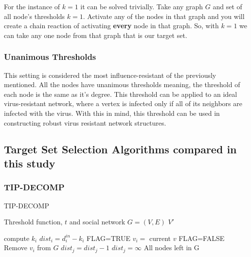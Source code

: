 For the instance of $k=1$ it can be solved trivially. Take any graph $G$ and set of all node's thresholds $k=1$. Activate any of the nodes in that graph and you will create a chain reaction of activating \textbf{every} node in that graph. So, with $k=1$ we can take any one node from that graph that is our target set.\cite{chen}
\subsubsection{Unanimous Thresholds}
This setting is considered the most influence-resistant of the previously mentioned.\cite{chen} All the nodes have unanimous thresholds meaning, the threshold of each node is the same as it's degree. This threshold can be applied to an ideal virus-resistant network, where a vertex is infected only if all of its neighbors are infected with the virus. With this in mind, this threshold can be used in constructing robust virus resistant network structures.\cite{chen}
\subsection{Target Set Selection Algorithms compared in this study}

\subsubsection{TIP-DECOMP}
\begin{algorithm}
	\caption{TIP-DECOMP}
	\begin{algorithmic}[1]
		\Require Threshold function, $t$ and social network $G=(V,E)$
		\Ensure $V'$
		
			\State compute $k_{i}$ 
		\EndFor
			\State $dist_{i}=d_{i}^{in}-k_{i} $
		\EndFor
		\State FLAG=TRUE 
					\State $v_{i}=$ current $v$
				\EndIf
			\EndFor
				\State FLAG=FALSE 
			\Else
			\State Remove $v_{i}$ from $G$ 
						\State $dist_{j}=dist_{j}-1$
					\Else
						\State$dist_{j}=\infty$  
					\EndIf
				\EndFor
			\EndIf
		\EndWhile
		\State \Return All nodes left in G 
	\end{algorithmic}
\end{algorithm}

